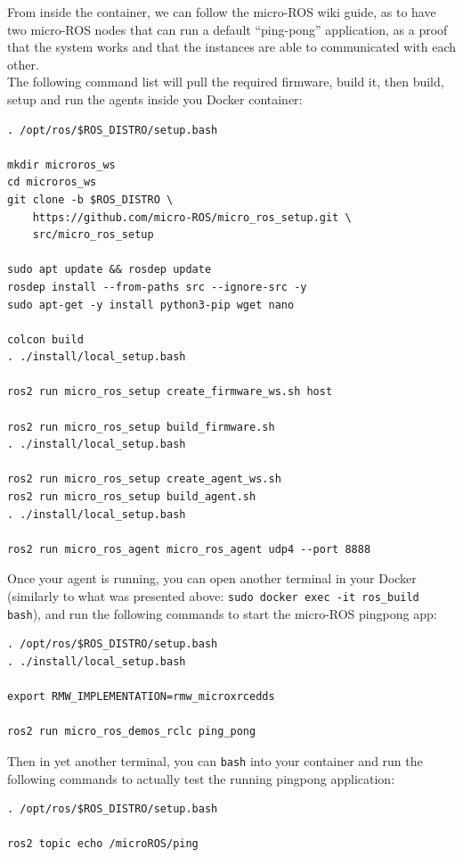\documentclass[10pt]{article}
\begin{document}
From inside the container, we can follow the micro-ROS wiki guide, as to have two micro-ROS nodes that can run a default ``ping-pong'' application, as a proof that the system works and that the instances are able to communicated with each other.\\
The following command list will pull the required firmware, build it, then build, setup and run the agents inside you Docker container:
\begin{tcolorbox}
\begin{verbatim}
. /opt/ros/$ROS_DISTRO/setup.bash

mkdir microros_ws
cd microros_ws
git clone -b $ROS_DISTRO \
    https://github.com/micro-ROS/micro_ros_setup.git \
    src/micro_ros_setup

sudo apt update && rosdep update
rosdep install --from-paths src --ignore-src -y
sudo apt-get -y install python3-pip wget nano

colcon build
. ./install/local_setup.bash

ros2 run micro_ros_setup create_firmware_ws.sh host

ros2 run micro_ros_setup build_firmware.sh
. ./install/local_setup.bash

ros2 run micro_ros_setup create_agent_ws.sh
ros2 run micro_ros_setup build_agent.sh
. ./install/local_setup.bash

ros2 run micro_ros_agent micro_ros_agent udp4 --port 8888
\end{verbatim}
\end{tcolorbox}

Once your agent is running, you can open another terminal in your Docker (similarly to what was presented above: \verb|sudo docker exec -it ros_build bash|), and run the following commands to start the micro-ROS pingpong app:
\begin{tcolorbox}
\begin{verbatim}
. /opt/ros/$ROS_DISTRO/setup.bash
. ./install/local_setup.bash

export RMW_IMPLEMENTATION=rmw_microxrcedds

ros2 run micro_ros_demos_rclc ping_pong
\end{verbatim}
\end{tcolorbox}

Then in yet another terminal, you can \verb|bash| into your container and run the following commands to actually test the running pingpong application:
\begin{tcolorbox}
\begin{verbatim}
. /opt/ros/$ROS_DISTRO/setup.bash

ros2 topic echo /microROS/ping

\end{verbatim}
\end{tcolorbox}
\end{document}
